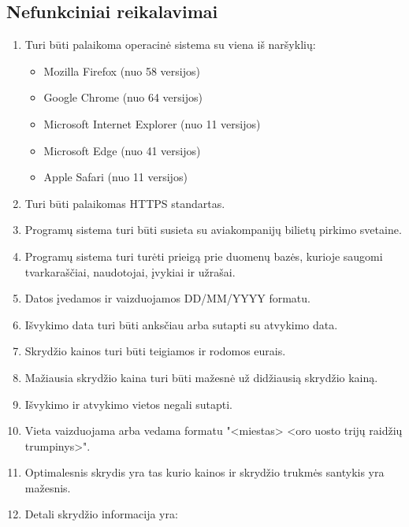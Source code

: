 \documentclass{VUMIFPSkursinis}
\begin{document}
            \subsection{Nefunkciniai reikalavimai}
                \begin{enumerate}[label=\textbf{NFR\arabic*}.]
                    \item Turi būti palaikoma operacinė sistema su viena iš naršyklių:
                    \begin{itemize}
                        \item Mozilla Firefox (nuo 58 versijos)
                        \item Google Chrome (nuo 64 versijos)
                        \item Microsoft Internet Explorer (nuo 11 versijos)
                        \item Microsoft Edge (nuo 41 versijos)
                        \item Apple Safari (nuo 11 versijos)
                    \end{itemize}
                    \item Turi būti palaikomas HTTPS standartas.
                    \item Programų sistema turi būti susieta su aviakompanijų bilietų pirkimo svetaine.
                    \item Programų sistema turi turėti prieigą prie duomenų bazės, kurioje saugomi tvarkaraščiai, naudotojai, įvykiai ir užrašai.
                    \item Datos įvedamos ir vaizduojamos DD/MM/YYYY formatu.
                    \item Išvykimo data turi būti anksčiau arba sutapti su atvykimo data.
                    \item Skrydžio kainos turi būti teigiamos ir rodomos eurais.
                    \item Mažiausia skrydžio kaina turi būti mažesnė už didžiausią skrydžio kainą.
                    \item Išvykimo ir atvykimo vietos negali sutapti.
                    \item Vieta vaizduojama arba vedama formatu "<miestas> <oro uosto trijų raidžių trumpinys>".
                    \item \label{optimal} Optimalesnis skrydis yra tas kurio kainos ir skrydžio trukmės santykis yra mažesnis.
                    \item Detali skrydžio informacija yra:
                    \begin{itemize}

\end{itemize}
\end{enumerate}
\end{document}
